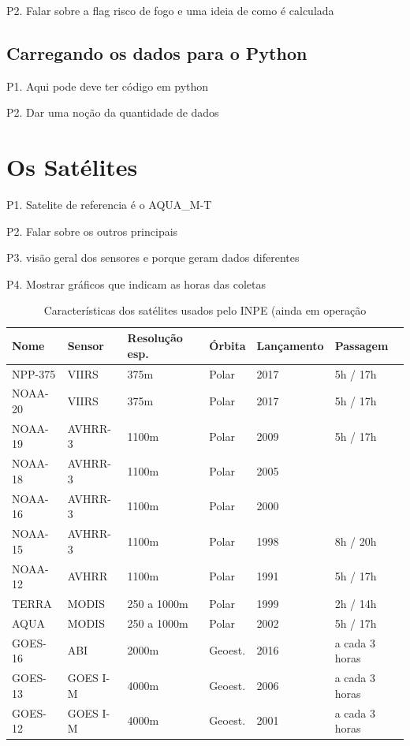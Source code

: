 \documentclass[cic,tc]{iiufrgs}
\begin{document}
P2. Falar sobre a flag risco de fogo e uma ideia de como é calculada \par

\subsection{Carregando os dados para o Python} 

P1. Aqui pode deve ter código em python \par
P2. Dar uma noção da quantidade de dados \par

\section{Os Satélites}

P1. Satelite de referencia é o AQUA\_M-T \citep{PerguntasFrequentesINPE} \par
P2. Falar sobre os outros principais \par
P3. visão geral dos sensores e porque geram dados diferentes \par
P4. Mostrar gráficos que indicam as horas das coletas


\begin{table}[h!]
\centering
\begin{tabular}{ | l l l l l l | }
\hline
  Nome & Sensor & Resolução esp. & Órbita & Lançamento & Passagem \\
\hline
  NPP-375 & VIIRS    & 375m        & Polar   & 2017 & 5h / 17h \\
  NOAA-20 & VIIRS    & 375m        & Polar   & 2017 & 5h / 17h \\
  NOAA-19 & AVHRR-3  & 1100m       & Polar   & 2009 & 5h / 17h \\
  NOAA-18 & AVHRR-3  & 1100m       & Polar   & 2005 &  \\
  NOAA-16 & AVHRR-3  & 1100m       & Polar   & 2000 &  \\
  NOAA-15 & AVHRR-3  & 1100m       & Polar   & 1998 & 8h / 20h \\
  NOAA-12 & AVHRR    & 1100m       & Polar   & 1991 & 5h / 17h \\
  TERRA   & MODIS    & 250 a 1000m & Polar   & 1999 & 2h / 14h \\
  AQUA    & MODIS    & 250 a 1000m & Polar   & 2002 & 5h / 17h \\
  GOES-16 & ABI      & 2000m       & Geoest. & 2016 & a cada 3 horas \\
  GOES-13 & GOES I-M & 4000m       & Geoest. & 2006 & a cada 3 horas \\
  GOES-12 & GOES I-M & 4000m       & Geoest. & 2001 & a cada 3 horas \\
 \hline
\end{tabular}
\caption{Características dos satélites usados pelo INPE (ainda em operação}
\label{table:satelites}
\end{table}
\end{document}
